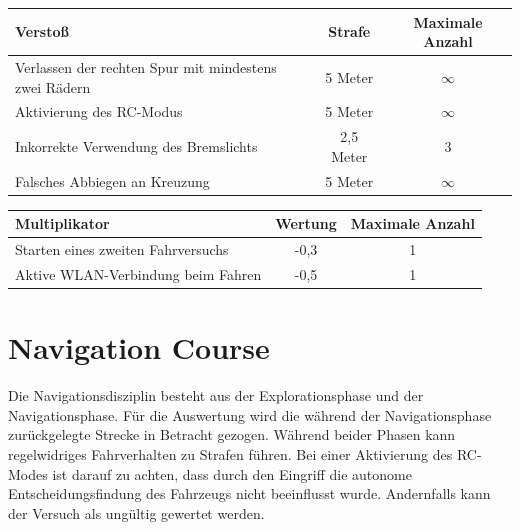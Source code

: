 \documentclass[a4paper, 11pt,usegeometry]{scrartcl}
\begin{document}
\begin{table}[H]
\begin{tabular}{|p{}|c|c|}
\hline
\rowcolor[HTML]{CACACA} 
\textbf{Verstoß}                                  & \textbf{Strafe} & \textbf{Maximale Anzahl} \\ \hline
Verlassen der rechten Spur mit mindestens zwei Rädern & 5 Meter         & $\infty$                 \\ \hline
Aktivierung des RC-Modus                          & 5 Meter         & $\infty$                 \\ \hline
Inkorrekte Verwendung des Bremslichts             & 2,5 Meter       & 3                        \\ \hline
Falsches Abbiegen an Kreuzung                     & 5 Meter         & $\infty$                 \\ \hline
\end{tabular}
\end{table}
\begin{table}[H]
\begin{tabular}{|p{}|c|c|}
\hline
\rowcolor[HTML]{CACACA} 
\textbf{Multiplikator}             & \textbf{Wertung} & \textbf{Maximale Anzahl} \\ \hline
Starten eines zweiten Fahrversuchs & -0,3             & 1                  \\ \hline
Aktive WLAN-Verbindung beim Fahren & -0,5             & 1                   \\ \hline
\end{tabular}
\end{table}

\section*{Navigation Course}
Die Navigationsdisziplin besteht aus der Explorationsphase und der Navigationsphase.
Für die Auswertung wird die während der Navigationsphase zurückgelegte Strecke in Betracht gezogen.
Während beider Phasen kann regelwidriges Fahrverhalten zu Strafen führen. Bei einer Aktivierung des RC-Modes
ist darauf zu achten, dass durch den Eingriff die autonome Entscheidungsfindung des Fahrzeugs nicht beeinflusst
wurde. Andernfalls kann der Versuch als ungültig gewertet werden.
\end{document}

